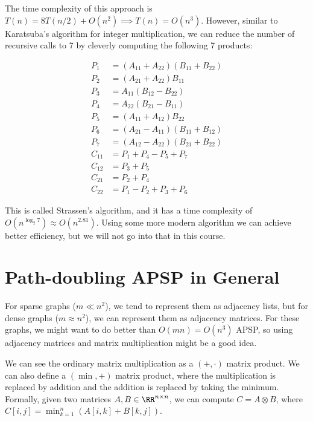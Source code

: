 The time complexity of this approach is $T(n) = 8T(n/2) + O(n^2) \implies T(n) = O(n^3)$. However, similar to Karatsuba's algorithm for integer multiplication, we can reduce the number of recursive calls to 7 by cleverly computing the following 7 products:

\begin{align*}
	P_1    & = (A_{11} + A_{22})(B_{11} + B_{22}) \\
	P_2    & = (A_{21} + A_{22})B_{11}            \\
	P_3    & = A_{11}(B_{12} - B_{22})            \\
	P_4    & = A_{22}(B_{21} - B_{11})            \\
	P_5    & = (A_{11} + A_{12})B_{22}            \\
	P_6    & = (A_{21} - A_{11})(B_{11}+B_{12})   \\
	P_7    & = (A_{12} - A_{22})(B_{21}+B_{22})   \\
	C_{11} & = P_1 + P_4 - P_5 + P_7              \\
	C_{12} & = P_3 + P_5                          \\
	C_{21} & = P_2 + P_4                          \\
	C_{22} & = P_1 - P_2 + P_3 + P_6
\end{align*}

This is called Strassen's algorithm, and it has a time complexity of $O(n^{\log_2 7}) \approx O(n^{2.81})$. Using some more modern algorithm we can achieve better efficiency, but we will not go into that in this course.

\section{Path-doubling APSP in General}

For sparse graphs ($m \ll n^2$), we tend to represent them as adjacency lists, but for dense graphs ($m\approx n^2$), we can represent them as adjacency matrices. For these graphs, we might want to do better than $O(mn) = O(n^3)$ APSP, so using adjacency matrices and matrix multiplication might be a good idea.

We can see the ordinary matrix multiplication as a $(+, \cdot)$ matrix product. We can also define a $(\min, +)$ matrix product, where the multiplication is replaced by addition and the addition is replaced by taking the minimum. Formally, given two matrices $A, B\in \RR ^{n\times n}$, we can compute $C = A \otimes B$, where $C[i,j] = \min_{k=1}^n (A[i,k] + B[k,j])$.

